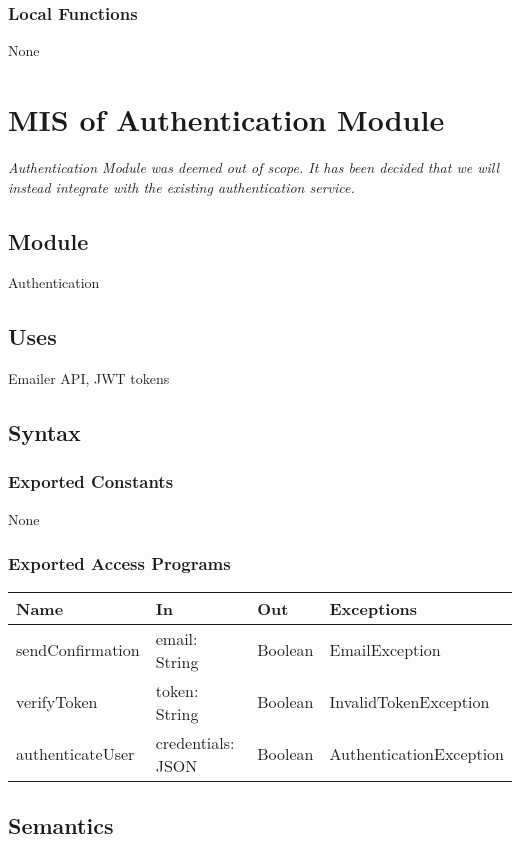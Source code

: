 \documentclass[12pt, titlepage]{article}
\begin{document}
\subsubsection{Local Functions}
None

\section{MIS of Authentication Module} \label{AuthenticationModule}

\textit{Authentication Module was deemed out of scope. It has been decided that we will instead integrate with the existing authentication service.}

\subsection{Module}
Authentication

\subsection{Uses}
Emailer API, JWT tokens

\subsection{Syntax}

\subsubsection{Exported Constants}
None

\subsubsection{Exported Access Programs}
\begin{center}
\begin{tabular}{p{4cm} p{4cm} p{4cm} p{2cm}}
\hline
\textbf{Name} & \textbf{In} & \textbf{Out} & \textbf{Exceptions} \\
\hline
sendConfirmation & email: String & Boolean & EmailException \\
verifyToken & token: String & Boolean & InvalidTokenException \\
authenticateUser & credentials: JSON & Boolean & AuthenticationException \\
\hline
\end{tabular}
\end{center}

\subsection{Semantics}
\end{document}
